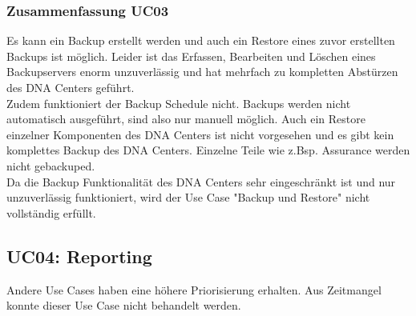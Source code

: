 \begin{landscape}
\subsubsection{Zusammenfassung UC03}
Es kann ein Backup erstellt werden und auch ein Restore eines zuvor erstellten Backups ist möglich. Leider ist das Erfassen, Bearbeiten und Löschen eines Backupservers enorm unzuverlässig und hat mehrfach zu kompletten Abstürzen des DNA Centers geführt. \\
Zudem funktioniert der Backup Schedule nicht. Backups werden nicht automatisch ausgeführt, sind also nur manuell möglich. Auch ein Restore einzelner Komponenten des DNA Centers ist nicht vorgesehen und es gibt kein komplettes Backup des DNA Centers. Einzelne Teile wie z.Bsp. Assurance werden nicht gebackuped. \\
Da die Backup Funktionalität des DNA Centers sehr eingeschränkt ist und nur unzuverlässig funktioniert, wird der Use Case "Backup und Restore" nicht vollständig erfüllt.
\pagebreak

\pagebreak


\subsection{UC04: Reporting}
Andere Use Cases haben eine höhere Priorisierung erhalten. Aus Zeitmangel konnte dieser Use Case nicht behandelt werden. 


\end{landscape}
